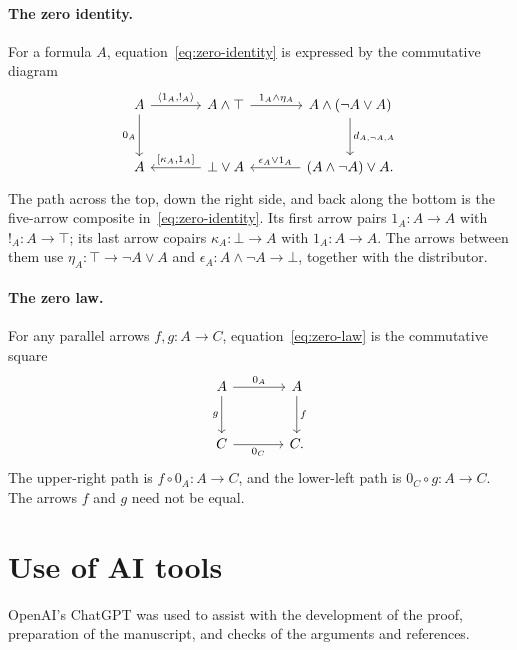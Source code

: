 \documentclass[11pt]{article}
\begin{document}
\paragraph{The zero identity.}
For a formula $A$, equation~\eqref{eq:zero-identity} is expressed by
the commutative diagram
\[
\begin{tikzcd}[column sep=large,row sep=large]
 A\arrow[r,"{\langle1_A,!_A\rangle}"]\arrow[d,"0_A"']
   &A\wedge\top\arrow[r,"1_A\wedge\eta_A"]
   &A\wedge(\neg A\vee A)\arrow[d,"d_{A,\neg A,A}"]\\
 A
   &\bot\vee A\arrow[l,"{[\kappa_A,1_A]}"']
   &(A\wedge\neg A)\vee A\arrow[l,"\epsilon_A\vee1_A"'].
\end{tikzcd}
\]
The path across the top, down the right side, and back along the
bottom is the five-arrow composite in~\eqref{eq:zero-identity}.
Its first arrow pairs $1_A:A\to A$ with $!_A:A\to\top$;
its last arrow copairs $\kappa_A:\bot\to A$ with $1_A:A\to A$.
The arrows between them use
$\eta_A:\top\to\neg A\vee A$ and
$\epsilon_A:A\wedge\neg A\to\bot$, together with the distributor.

\paragraph{The zero law.}
For any parallel arrows $f,g:A\to C$,
equation~\eqref{eq:zero-law} is the commutative square
\[
\begin{tikzcd}[column sep=large,row sep=large]
 A\arrow[r,"0_A"]\arrow[d,"g"']&A\arrow[d,"f"]\\
 C\arrow[r,"0_C"']&C.
\end{tikzcd}
\]
The upper-right path is $f\circ0_A:A\to C$, and the lower-left
path is $0_C\circ g:A\to C$. The arrows $f$ and $g$ need not be equal.

\section*{Use of AI tools}
OpenAI's ChatGPT was used to assist with the development of the proof,
preparation of the manuscript, and checks of the arguments and references.
\end{document}
